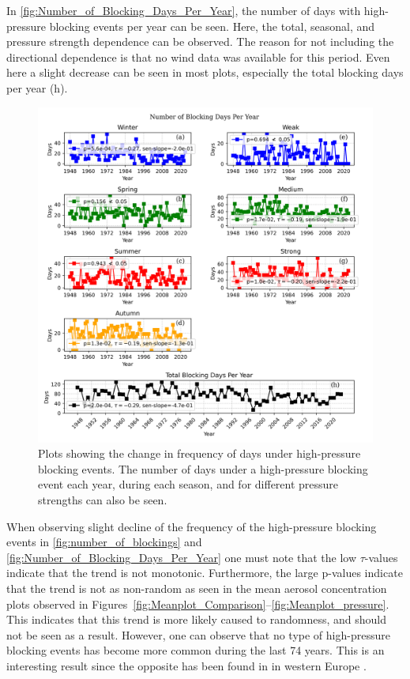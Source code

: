 In \autoref{fig:Number_of_Blocking_Days_Per_Year}, the number of days with high-pressure blocking events per year can be seen. Here, the total, seasonal, and pressure strength dependence can be observed. The reason for not including the directional dependence is that no wind data was available for this period. Even here a slight decrease can be seen in most plots, especially the total blocking days per year (h). 


\begin{figure}[H]
    \centering
    \includegraphics[width=\textwidth]{Figures/blocking_days_per_year_all.png}
    \caption{Plots showing the change in frequency of days under high-pressure blocking events. The number of days under a high-pressure blocking event each year, during each season, and for different pressure strengths can also be seen.}
    \label{fig:Number_of_Blocking_Days_Per_Year}
\end{figure}

When observing slight decline of the frequency of the high-pressure blocking events in \autoref{fig:number_of_blockings} and \autoref{fig:Number_of_Blocking_Days_Per_Year} one must note that the low $\tau$-values indicate that the trend is not monotonic. Furthermore, the large p-values indicate that the trend is not as non-random as seen in the mean aerosol concentration plots observed in Figures~\ref{fig:Meanplot_Comparison}--\ref{fig:Meanplot_pressure}. This indicates that this trend is more likely caused to randomness, and should not be seen as a result. However, one can observe that no type of high-pressure blocking events has become more common during the last 74 years. This is an interesting result since the opposite has been found in in western Europe \cite{lupoAtmosphericBlockingEvents2020}. 
